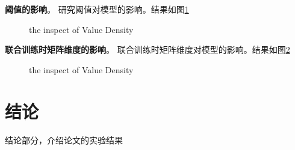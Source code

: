 \documentclass[lang=cn,11pt]{elegantpaper}
\begin{document}
\textbf{阈值的影响}。 研究阈值对模型的影响。结果如图\ref{fig:threshold}
\begin{figure}[htbp]
	\centering
	\quad
	\quad
	\quad
	\caption{ the inspect of Value Density \label{fig:threshold}} 
\end{figure}


\textbf{联合训练时矩阵维度的影响}。 联合训练时矩阵维度对模型的影响。结果如图\ref{fig:Density}
\begin{figure}[htbp]
	\centering
	\quad
	\quad
	\quad
	\caption{ the inspect of Value Density \label{fig:Density}} 
\end{figure}


\section{结论}
结论部分，介绍论文的实验结果



\end{document}
